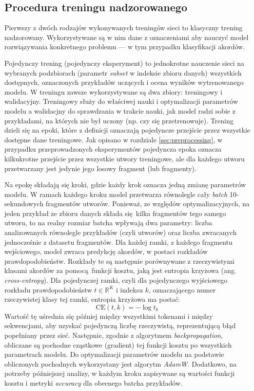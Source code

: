 \subsection{Procedura treningu nadzorowanego}

Pierwszy z dwóch rodzajów wykonywanych treningów sieci to klasyczny trening nadzorowany.
Wykorzystywane są w nim dane z oznaczeniami aby nauczyć model rozwiązywania konkretnego problemu ---
w tym przypadku klasyfikacji akordów. 

Pojedynczy trening (pojedynczy eksperyment) to jednokrotne nauczenie sieci na wybranych podzbiorach
(parametr \emph{subset} w indeksie zbioru danych) wszystkich dostępnych, oznaczonych przykładów
uczących i ocena wyników wytrenowanego modelu. W treningu zawsze wykorzystywane są dwa zbiory:
treningowy i walidacyjny. Treningowy służy do właściwej nauki i optymalizacji parametrów modelu a
walidacjny do sprawdzania w trakcie nauki, jak model radzi sobie z przykładami, na których nie był
uczony (np. czy się przetrenowuje). Trening dzieli się na epoki, które z definicji oznaczają
pojedyncze przejście przez wszystkie dostępne dane treningowe. Jak opisano w rozdziale
\ref{sec:preprocessing}, w przypadku przeprowadzonych eksperymentów pojedyncza epoka oznacza
kilkukrotne przejście przez wszystkie utwory treningowe, ale dla każdego utworu przetwarzany jest
jedynie jego losowy fragment (lub fragmenty).

Na epokę składają się kroki, gdzie każdy krok oznacza jedną zmianę parametrów modelu. W ramach
każdego kroku model przetwarza równolegle cały \emph{batch} 10-sekundowych fragmentów utworów.
Ponieważ, ze względów optymalizacyjnych, na jeden przykład ze zbioru danych składa się kilka
fragmentów tego samego utworu, to na realny rozmiar batcha wpływają dwa parametry: liczba
analizowanych równolegle przykładów (czyli utworów) oraz liczba zwracanych jednocześnie z datasetu
fragmentów. Dla każdej ramki, z każdego fragmentu wejściowego, model zwraca predykcję akordów, w
postaci rozkładów prawdopodobieństw. Rozkłady te są następnie porównywane z rzeczywistymi klasami
akordów za pomocą funkcji kosztu, jaką jest entropia krzyżowa (ang. \emph{cross-entropy}). Dla
pojedynczej ramki, czyli dla pojedynczego wyjściowego rozkładu prawdopodobieństw $t \in
\mathbb{R}^K$ i indeksu $k$, oznaczającego numer rzeczywistej klasy tej ramki, entropia krzyżowa ma
postać:
\begin{equation}
    \textrm{CE}(t, k) = - \log t_k
\end{equation}
Wartość tę uśrednia się później między wszystkimi tokenami i między sekwencjami, aby uzyskać
pojedynczą liczbę rzeczywistą, reprezentującą błąd popełniany przez sieć. Następnie, zgodnie z
algorytmem \emph{backpropagation}, obliczane są pochodne cząstkowe (gradient) tej funkcji kosztu po
wszystkich parametrach modelu. Do optymalizacji parametrów modelu na podstawie obliczonych
pochodnych wykorzystany jest algorytm \emph{AdamW}. Dodatkowo, na potrzeby późniejszej analizy, w
każdym kroku zapisywane są wartości funkcji kosztu i metryki \emph{accuracy} dla obecnego batcha
przykładów.

